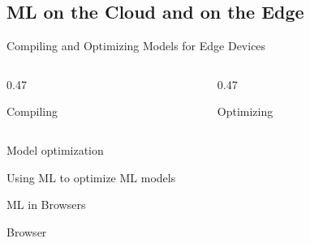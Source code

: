 \subsection{ML on the Cloud and on the Edge}

\begin{frame}{Compiling and Optimizing Models for Edge Devices}
  \begin{columns}[T,onlytextwidth]
    \begin{column}{0.47\textwidth}
      \begin{tdblockt}[equal height group=edge]{Compiling}
      \end{tdblockt}
    \end{column}
    \begin{column}{0.47\textwidth}
      \begin{tdblockt}[equal height group=edge]{Optimizing}
      \end{tdblockt}
    \end{column}
  \end{columns}
\end{frame}

\begin{frame}{Model optimization}
  \begin{sidebody}
  \end{sidebody}
\end{frame}

\begin{frame}{Using ML to optimize ML models}
  \begin{withmargin}
    \begin{tdmain}
    \end{tdmain}
    \begin{tdmargin}
    \end{tdmargin}
  \end{withmargin}
\end{frame}

\begin{frame}{ML in Browsers}
  \begin{withmargin}
    \begin{tdmain}
      \begin{tdcodet}{Browser}
      \end{tdcodet}
    \end{tdmain}
    \begin{tdmargin}
    \end{tdmargin}
  \end{withmargin}
\end{frame}

